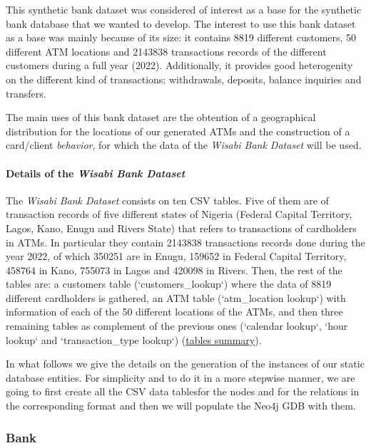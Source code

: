 \documentclass{article}
\begin{document}
This synthetic bank dataset was considered of interest as a base for the synthetic bank
database that we wanted to develop. The interest to use this bank dataset as a base was mainly because of its size: it contains 8819 different customers, 50 different ATM locations and 2143838 transactions records of the different customers during a full year (2022). Additionally, it provides good heterogenity on the different kind of transactions: withdrawals, deposits, balance inquiries and transfers.

The main uses of this bank dataset are the obtention of a geographical distribution for
the locations of our generated ATMs and the construction of a card/client \emph{behavior},
for which the data of the \emph{Wisabi Bank Dataset} will be used.

\paragraph{Details of the \emph{Wisabi Bank Dataset}}
The \emph{Wisabi Bank Dataset} consists on ten CSV tables. Five of them are of transaction records of five different states of Nigeria (Federal Capital Territory, Lagos, Kano, Enugu and Rivers State) that refers to transactions of cardholders in ATMs. In particular they contain 2143838 transactions records done during the year 2022, of which 350251 are in Enugu, 159652 in Federal Capital Territory, 458764 in Kano, 755073 in Lagos and 420098 in Rivers. Then, the rest of the tables are: a customers table (`customers\_lookup`) where the data
of 8819 different cardholders is gathered, an ATM table (`atm\_location lookup`) with
information of each of the 50 different locations of the ATMs, and then three remaining
tables as complement of the previous ones (`calendar lookup`, `hour lookup` and 
`transaction\_type lookup`) 
(\href{https://app.diagrams.net/#G1eAn47YR7-zPNE5KgStkA6_IJcxZRYgX8#%7B%22pageId%22%3A%22R2lEEEUBdFMjLlhIrx00%22%7D}{tables summary}).

In what follows we give the details on the generation of the instances of our static database
entities.
For simplicity and to do it in a more stepwise manner, we are going to first create all the CSV data tablesfor the nodes and for the relations in the corresponding format and then we will populate the Neo4j GDB with them.

\subsubsection*{Bank}
\end{document}
